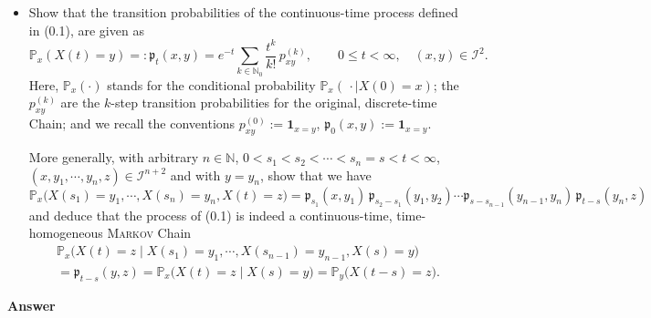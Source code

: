 \documentclass[letterpaper]{article}
\begin{document}
		\begin{itemize}
			\item[(a)] Show that the transition probabilities of the continuous-time process defined in (0.1), are given as
			\begin{equation}
				\mathbb{P}_x(X(t) = y) =: \mathfrak{p}_t(x,y) = e^{-t} \sum_{k \in \mathbb{N}_0} \frac{t^k}{k!}\, p_{xy}^{(k)}, \qquad 0 \leq t < \infty, \quad (x,y) \in \mathcal{I}^2. \tag{0.2}
			\end{equation}
			Here, $\mathbb{P}_x(\cdot)$ stands for the conditional probability $\mathbb{P}_x(\,\cdot \mid X(0) = x)$; the $p_{xy}^{(k)}$ are the $k$-step transition probabilities for the original, discrete-time Chain; and we recall the conventions $p_{xy}^{(0)} := \mathbf{1}_{x=y}$, $\mathfrak{p}_0(x,y) := \mathbf{1}_{x=y}$.
			
			More generally, with arbitrary $n \in \mathbb{N}$, $0 < s_1 < s_2 < \cdots < s_n = s < t < \infty$, $(x, y_1, \cdots, y_n, z) \in \mathcal{I}^{n+2}$ and with $y = y_n$, show that we have
			\[
			\mathbb{P}_x\bigl(X(s_1) = y_1, \cdots, X(s_n) = y_n, X(t) = z\bigr) = \mathfrak{p}_{s_1}(x, y_1)\, \mathfrak{p}_{s_2 - s_1}(y_1, y_2) \cdots \mathfrak{p}_{s - s_{n-1}}(y_{n-1}, y_n)\, \mathfrak{p}_{t-s}(y_n, z)
			\]
			and deduce that the process of (0.1) is indeed a continuous-time, time-homogeneous \textsc{Markov} Chain
			\begin{align*}
				\mathbb{P}_x\bigl(X(t) = z \mid X(s_1) = y_1, \cdots, X(s_{n-1}) = y_{n-1}, X(s) = y\bigr) \\
				= \mathfrak{p}_{t-s}(y, z) = \mathbb{P}_x\bigl(X(t) = z \mid X(s) = y\bigr) = \mathbb{P}_y\bigl(X(t-s) = z\bigr).
			\end{align*}
			\end{itemize}
			
				\textbf{Answer}
			
			\clearpage
			
\end{document}
